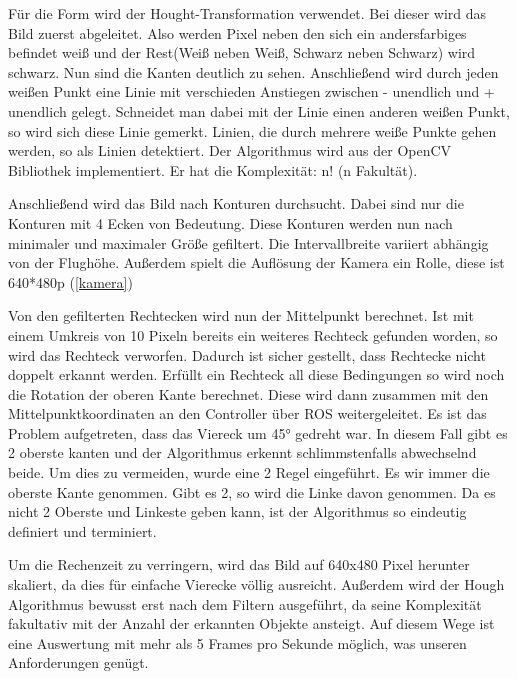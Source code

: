 Für die Form wird der Hought-Transformation verwendet. Bei dieser wird das Bild zuerst abgeleitet. Also werden Pixel neben den sich ein andersfarbiges befindet weiß und der Rest(Weiß neben Weiß, Schwarz neben Schwarz) wird schwarz. Nun sind die Kanten deutlich zu sehen. Anschließend wird durch jeden weißen Punkt eine Linie mit verschieden Anstiegen zwischen - unendlich und + unendlich gelegt. Schneidet man dabei mit der Linie einen anderen weißen Punkt, so wird sich diese Linie gemerkt. Linien, die durch mehrere weiße Punkte gehen werden, so als Linien detektiert. Der Algorithmus wird aus der OpenCV Bibliothek implementiert. Er hat die Komplexität: n! (n Fakultät). \cite{wenyu2007}

Anschließend wird das Bild nach Konturen durchsucht. Dabei sind nur die Konturen mit 4 Ecken von Bedeutung. Diese Konturen werden nun nach minimaler und maximaler Größe gefiltert. Die Intervallbreite variiert abhängig von der Flughöhe. Außerdem spielt die Auflösung der Kamera ein Rolle, diese ist 640*480p (\ref{kamera})

Von den gefilterten Rechtecken wird nun der Mittelpunkt berechnet. Ist mit einem Umkreis von 10 Pixeln bereits ein weiteres Rechteck gefunden worden, so wird das Rechteck verworfen. Dadurch ist sicher gestellt, dass Rechtecke nicht doppelt erkannt werden. Erfüllt ein Rechteck all diese Bedingungen so wird noch die Rotation der oberen Kante berechnet. Diese wird dann zusammen mit den Mittelpunktkoordinaten an den Controller über ROS weitergeleitet. Es ist das Problem aufgetreten, dass das Viereck um 45° gedreht war. In diesem Fall gibt es 2 oberste kanten und der Algorithmus erkennt schlimmstenfalls abwechselnd beide. Um dies zu vermeiden, wurde eine 2 Regel eingeführt. Es wir immer die oberste Kante genommen. Gibt es 2, so wird die Linke davon genommen. Da es nicht 2 Oberste und Linkeste geben kann, ist der Algorithmus so eindeutig definiert und terminiert.\cite{Lagunovsky1997}

Um die Rechenzeit zu verringern, wird das Bild auf 640x480 Pixel herunter skaliert, da dies für einfache Vierecke völlig ausreicht. Außerdem wird der Hough Algorithmus bewusst erst nach dem Filtern ausgeführt, da seine Komplexität fakultativ mit der Anzahl der erkannten Objekte ansteigt. Auf diesem Wege ist eine Auswertung mit mehr als 5 Frames pro Sekunde möglich, was unseren Anforderungen genügt.

